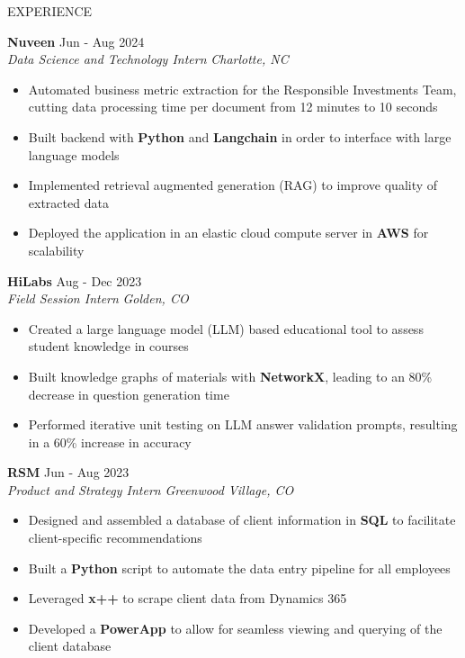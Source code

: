 \documentclass{resume} %
\begin{document}
\begin{rSection}{EXPERIENCE}

\textbf{Nuveen} \hfill Jun - Aug 2024\\
\textit{Data Science and Technology Intern} \hfill \textit{Charlotte, NC}
\vspace{-6pt}
 \begin{itemize}[leftmargin=*]
    \itemsep -6pt {} 
    \item Automated business metric extraction for the Responsible Investments Team, cutting data processing time per document from 12 minutes to 10 seconds
    \item Built backend with \textbf{Python} and \textbf{Langchain} in order to interface with large language models
    \item Implemented retrieval augmented generation (RAG) to improve quality of extracted data
    \item Deployed the application in an elastic cloud compute server in \textbf{AWS} for scalability
 \end{itemize}

 \textbf{HiLabs} \hfill Aug - Dec 2023\\
\textit{Field Session Intern} \hfill \textit{Golden, CO}
\vspace{-6pt}
 \begin{itemize}[leftmargin=*]
    \itemsep -6pt {} 
    \item Created a large language model (LLM) based educational tool to assess student knowledge in courses
    \item Built knowledge graphs of materials with \textbf{NetworkX}, leading to an 80\% decrease in question generation time
    \item Performed iterative unit testing on LLM answer validation prompts, resulting in a 60\% increase in accuracy
 \end{itemize}

\textbf{RSM} \hfill Jun - Aug 2023\\
\textit{Product and Strategy Intern} \hfill \textit{Greenwood Village, CO}
\vspace{-6pt}
 \begin{itemize}[leftmargin=*]
    \itemsep -6pt {} 
     \item Designed and assembled a database of client information in \textbf{SQL} to facilitate client-specific recommendations 
     \item Built a \textbf{Python} script to automate the data entry pipeline for all employees
     \item Leveraged \textbf{x++} to scrape client data from Dynamics 365
     \item Developed a \textbf{PowerApp} to allow for seamless viewing and querying of the client database
 \end{itemize}

\end{rSection}
\end{document}
